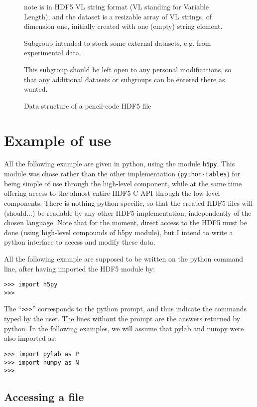 \documentclass[a4paper,12pt]{article}
\begin{document}
\begin{figure}[p]
{\begin{description}
\begin{description}
\begin{description}
      note is in HDF5 VL string format (VL standing for Variable
      Length), and the dataset is a resizable array of VL strings, of
      dimension one, initially created with one (empty) string
      element.
    \item[/etc/ext/] Subgroup intended to stock some external datasets,
      e.g. from experimental data.
    \item[/etc/...] This subgroup should be left open to any personal
      modifications, so that any additional datasets or subgroups can
      be entered there as wanted.
    \end{description}
  \end{description}
\end{description}
}%
\caption{Data structure of a pencil-code HDF5 file}
\label{fig:data-struct}
\end{figure}
\section{Example of use}
\label{sec:example-use}

All the following example are given in python, using the module
\texttt{h5py}. This module was chose rather than the other
implementation (\texttt{python-tables}) for being simple of use
through the high-level component, while at the same time offering
access  to the almost entire HDF5 C API through the low-level
components. There is nothing python-specific, so that the created
HDF5 files will (should...) be readable by any other HDF5
implementation, independently of the chosen language. Note that for
the moment, direct access to the HDF5 must be done (using high-level
compounds of h5py module), but I intend to write a python interface to
access and modify these data. 

All the following example are supposed to be written on the python
command line, after having imported the HDF5 module by:
\begin{verbatim}
>>> import h5py
>>>
\end{verbatim}
The ``\texttt{>>>}'' corresponds to the python prompt, and thus indicate
the commands typed by the user. The lines without the prompt are the
answers returned by python.
In the following examples, we will assume that pylab and numpy were
also imported as:
\begin{verbatim}
>>> import pylab as P
>>> import numpy as N
>>>
\end{verbatim}

\subsection{Accessing a file}
\label{sec:opening-file}
\end{document}
